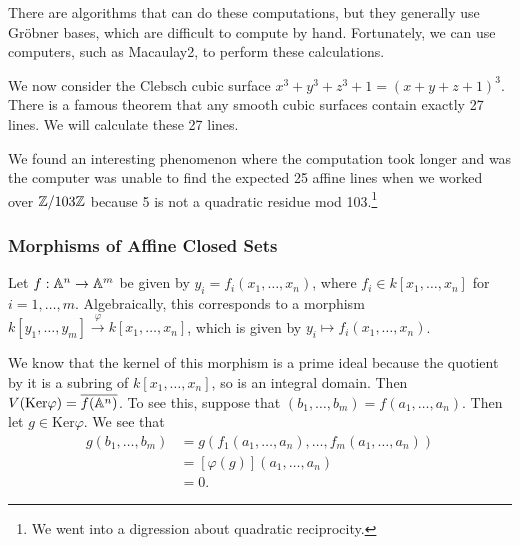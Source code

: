 \documentclass[twoside, 10pt]{article}
\begin{document}
    There are algorithms that can do these computations, but they generally use
    Gr\"obner bases, which are difficult to compute by hand. Fortunately, we
    can use computers, such as Macaulay2, to perform these calculations.

    \begin{mdframed}[style=default] 
    \end{mdframed}

    We now consider the Clebsch cubic surface $x^3+y^3+z^3+1 = (x+y+z+1)^3$.
    There is a famous theorem that any smooth cubic surfaces contain exactly 27
    lines. We will calculate these 27 lines.

    \begin{mdframed}[style=default] 
    \end{mdframed}

    We found an interesting phenomenon where the computation took longer and
    was the computer was unable to find the expected 25 affine lines when we
    worked over $\mathbb{Z}/103\mathbb{Z}$ because 5 is not a quadratic residue mod
    103.\footnote{We went into a digression about quadratic reciprocity.}

    \subsubsection{Morphisms of Affine Closed Sets}

    Let $f: \mathbb{A}^n \rightarrow \mathbb{A}^m$ be given by $y_i = f_i(x_1, \ldots, x_n)$,
    where $f_i \in k[x_1, \ldots, x_n]$ for $i = 1, \ldots, m$. Algebraically,
    this corresponds to a morphism $k[y_1, \ldots, y_m] \xrightarrow{\varphi}
    k[x_1, \ldots, x_n]$, which is given by $y_i \mapsto f_i(x_1, \ldots,
    x_n)$.

    We know that the kernel of this morphism is a prime ideal because the
    quotient by it is a subring of $k[x_1, \ldots, x_n]$, so is an integral
    domain. Then $V(\mathrm{Ker}\varphi) = \overline{f(\mathbb{A}^n)}$. To see this,
    suppose that $(b_1, \ldots, b_m) = f(a_1, \ldots, a_n)$. Then let $g \in
    \mathrm{Ker}\varphi$. We see that \begin{align*} g(b_1, \ldots, b_m) &=
        g(f_1(a_1, \ldots, a_n), \ldots, f_m(a_1, \ldots, a_n)) \\ &=
        [\varphi(g)](a_1, \ldots, a_n) \\ &= 0.  \end{align*}
    
\end{document}
